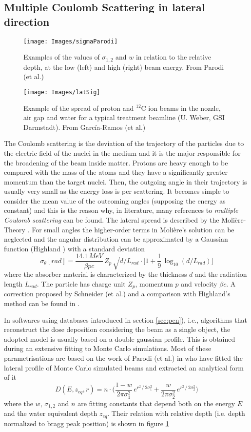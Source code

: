 \documentclass[12pt, a4paper, twoside]{book}
\begin{document}
\subsection{Multiple Coulomb Scattering in lateral direction}
\label{sec:mcs}
\begin{figure}[!t]
\centering
\texttt{[image: Images/sigmaParodi]}
\caption{Examples of the values of $\sigma_{1,2}$ and $w$ in relation to the relative depth, at the low (left) and high (right) beam energy. From Parodi (et al.) \cite{par:latspr}}
\label{fig:sigPar}
\end{figure}
\begin{figure}[!t]
\texttt{[image: Images/latSig]}
\caption{Example of the spread of proton and $^{12}$C ion beams in the nozzle, air gap and water for a typical treatment beamline (U. Weber, GSI Darmstadt). From García-Ramos (et al.) \cite{garc:nucu}}
\label{fig:latSig1}
\end{figure}
The Coulomb scattering is the deviation of the trajectory of the particles due to the electric field of the nuclei in the medium and it is the major responsible for the broadening of the beam inside matter. Protons are heavy enough to be compared with the mass of the atoms and they have a significantly greater momentum than the target nuclei. Then, the outgoing angle in their trajectory is usually very small as the energy loss is per scattering. It becomes simple to consider the mean value of the outcoming angles (supposing the energy as constant) and this is the reason why, in literature, many references to \emph{multiple Coulomb scattering} can be found.
The lateral spread is described by the Molière-Theory \cite{mol:mcs}. For small angles the higher-order terms in Molière's solution can be neglected and the angular distribution can be approximated by a Gaussian function (Highland \cite{high:mcs}) with a standard deviation 
\[
\sigma_\theta [rad]= \frac{14.1\,MeV}{\beta pc}\, Z_p\, \sqrt{d/L_{rad}} \cdot \bigg[ 1 + \frac{1}{9}\,\log_{10} (d/L_{rad} )\bigg]
\]
where the absorber material is characterized by the thickness $d$ and the radiation length $L_{rad}$. The particle has charge unit $Z_p$, momentum $p$ and velocity $\beta c$.
A correction proposed by Schneider (et al.) and a comparison with Highland's method can be found in \cite{schn:mcs}. 

In softwares using databases introduced in section \ref{sec:pen}), i.e., algorithms that reconstruct the dose deposition considering the beam as a single object, the adopted model is usually based on a double-gaussian profile. This is obtained during an extensive fitting to Monte Carlo simulations. Most of these parametrisations are based on the work of Parodi (et al.) in \cite{par:latspr} who have fitted the lateral profile of Monte Carlo simulated beams and extracted an analytical form of it
\[
D(E,z_{eq},r) = n\cdot \bigg(  \frac{1-w}{2\pi\sigma_1^2}\,e^{r^2\,/\,2\sigma_1^2} + \frac{w}{2\pi\sigma_2^2}\,e^{r^2\,/\,2\sigma_2^2} \bigg)
\]
where the $w$, $\sigma_{1,2}$ and $n$ are fitting constants that depend both on the energy $E$ and the water equivalent depth $z_{eq}$. Their relation with relative depth (i.e. depth normalized to bragg peak position) is shown in figure \ref{fig:sigPar}
\end{document}
